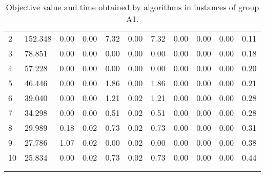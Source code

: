 {\begin{longtable}{@{}llccccccccc@{}}
\multicolumn{1}{l|}{2}  & \multicolumn{1}{l|}{152.348}    & 0.00 & \multicolumn{1}{c|}{0.00} & 7.32 & \multicolumn{1}{c|}{0.00} & 7.32 & \multicolumn{1}{c|}{0.00} & 0.00      & 0.00      & 0.11 \\
\multicolumn{1}{l|}{3}  & \multicolumn{1}{l|}{78.851}     & 0.00 & \multicolumn{1}{c|}{0.00} & 0.00 & \multicolumn{1}{c|}{0.00} & 0.00 & \multicolumn{1}{c|}{0.00} & 0.00      & 0.00      & 0.18 \\
\multicolumn{1}{l|}{4}  & \multicolumn{1}{l|}{57.228}     & 0.00 & \multicolumn{1}{c|}{0.00} & 0.00 & \multicolumn{1}{c|}{0.00} & 0.00 & \multicolumn{1}{c|}{0.00} & 0.00      & 0.00      & 0.20 \\
\multicolumn{1}{l|}{5}  & \multicolumn{1}{l|}{46.446}     & 0.00 & \multicolumn{1}{c|}{0.00} & 1.86 & \multicolumn{1}{c|}{0.00} & 1.86 & \multicolumn{1}{c|}{0.00} & 0.00      & 0.00      & 0.21 \\
\multicolumn{1}{l|}{6}  & \multicolumn{1}{l|}{39.040}     & 0.00 & \multicolumn{1}{c|}{0.00} & 1.21 & \multicolumn{1}{c|}{0.02} & 1.21 & \multicolumn{1}{c|}{0.00} & 0.00      & 0.00      & 0.28 \\
\multicolumn{1}{l|}{7}  & \multicolumn{1}{l|}{34.298}     & 0.00 & \multicolumn{1}{c|}{0.00} & 0.51 & \multicolumn{1}{c|}{0.02} & 0.51 & \multicolumn{1}{c|}{0.00} & 0.00      & 0.00      & 0.28 \\
\multicolumn{1}{l|}{8}  & \multicolumn{1}{l|}{29.989}     & 0.18 & \multicolumn{1}{c|}{0.02} & 0.73 & \multicolumn{1}{c|}{0.02} & 0.73 & \multicolumn{1}{c|}{0.00} & 0.00      & 0.00      & 0.31 \\
\multicolumn{1}{l|}{9}  & \multicolumn{1}{l|}{27.786}     & 1.07 & \multicolumn{1}{c|}{0.02} & 0.00 & \multicolumn{1}{c|}{0.02} & 0.00 & \multicolumn{1}{c|}{0.00} & 0.00      & 0.00      & 0.38 \\
\multicolumn{1}{l|}{10} & \multicolumn{1}{l|}{25.834}     & 0.00 & \multicolumn{1}{c|}{0.02} & 0.73 & \multicolumn{1}{c|}{0.02} & 0.73 & \multicolumn{1}{c|}{0.00} & 0.00      & 0.00      & 0.44 \\ \hline
\caption{Objective value and time obtained by algorithms in instances of group A1.}\\
\label{results-all-A1}\\
\end{longtable}}